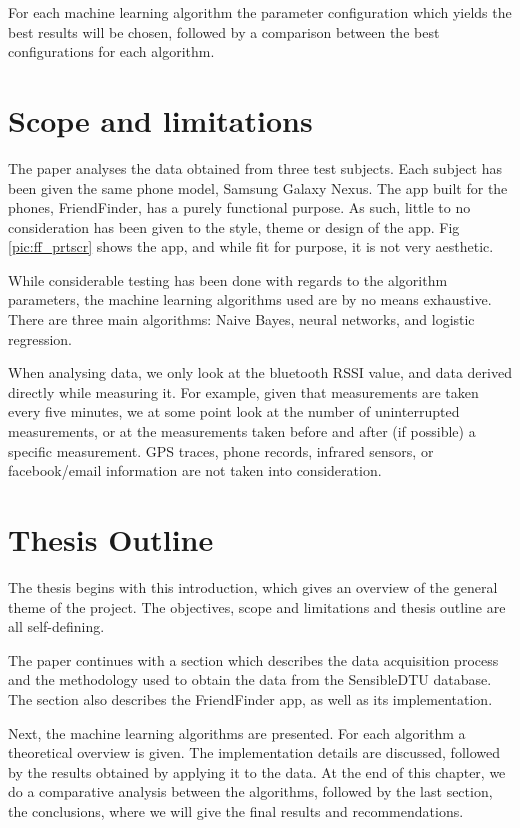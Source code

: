 For each machine learning algorithm the parameter configuration which yields the best results will be chosen, followed by a comparison between the best configurations for each algorithm.      

\section{Scope and limitations}

The paper analyses the data obtained from three test subjects. Each subject has been given the same phone model, Samsung Galaxy Nexus. The app built for the phones, FriendFinder, has a purely functional purpose. As such, little to no consideration has been given to the style, theme or design of the app. Fig \ref{pic:ff_prtscr} shows the app, and while fit for purpose, it is not very aesthetic.

While considerable testing has been done with regards to the algorithm parameters, the machine learning algorithms used are by no means exhaustive. There are three main algorithms: Naive Bayes, neural networks, and logistic regression.

When analysing data, we only look at the bluetooth RSSI value, and data derived directly while measuring it. For example, given that measurements are taken every five minutes, we at some point look at the number of uninterrupted measurements, or at the measurements taken before and after (if possible) a specific measurement. GPS traces, phone records, infrared sensors, or facebook/email information are not taken into consideration.

\section{Thesis Outline}

The thesis begins with this introduction, which gives an overview of the general theme of the project. The objectives, scope and limitations and thesis outline are all self-defining. 

The paper continues with a section which describes the data acquisition process and the methodology used to obtain the data from the SensibleDTU database. The section also describes the FriendFinder app, as well as its implementation.

Next, the machine learning algorithms are presented. For each algorithm a theoretical overview is given. The implementation details are discussed, followed by the results obtained by applying it to the data. At the end of this chapter, we do a comparative analysis between the algorithms, followed by the last section, the conclusions, where we will give the final results and recommendations.
